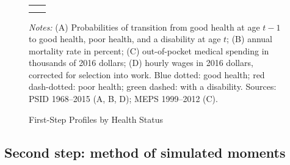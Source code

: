 \begin{figure}[!tp]
\centering
\caption{First-Step Profiles by Health Status}
\label{fig:firststep}
\vspace{6pt}
\begin{tabular}{cc}
 & \\[1.5ex]
 & 
\end{tabular}
\begin{minipage}{0.95\textwidth}\footnotesize{}
\textit{Notes:} (A) Probabilities of transition from good health at age $t-1$ to good health, poor health, and a disability at age $t$; (B) annual mortality rate in percent; (C) out-of-pocket medical spending in thousands of 2016 dollars; (D) hourly wages in 2016 dollars, corrected for selection into work. Blue dotted: good health; red dash-dotted: poor health; green dashed: with a disability. Sources: PSID 1968--2015 (A, B, D); MEPS 1999--2012 (C).
\end{minipage}
\end{figure}

\subsection{Second step: method of simulated moments}\label{subsec:msm}

